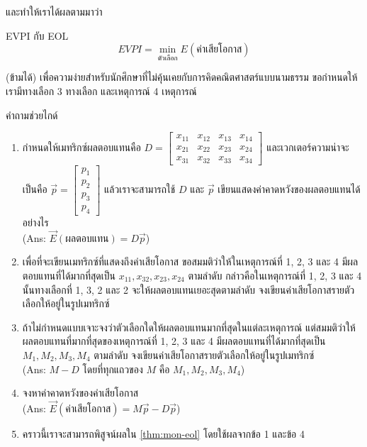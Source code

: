 และทำให้เราได้ผลตามมาว่า
\begin{corollary}
    {EVPI กับ EOL}{}
    $$
    EVPI = \min_{\text{ตัวเลือก}} E(\text{ค่าเสียโอกาส})
    $$
\end{corollary}
(ข้ามได้) เพื่อความง่ายสำหรับนักศึกษาที่ไม่คุ้นเคยกับการคิดคณิตศาสตร์แบบนามธรรม ขอกำหนดให้เรามีทางเลือก 3 ทางเลือก และเหตุการณ์ 4 เหตุการณ์ 
    \begin{exercise}
        {คำถามช่วยไกด์}{}
        \begin{enumerate}
            \item กำหนดให้เมทริกซ์ผลตอบแทนคือ $D=\begin{bmatrix}
                                                x_{11} & x_{12} & x_{13} & x_{14} \\
                                                x_{21} & x_{22} & x_{23} & x_{24} \\
                                                x_{31} & x_{32} & x_{33} & x_{34}
                                                \end{bmatrix}$ และเวกเตอร์ความน่าจะเป็นคือ $\vec{p} = \begin{bmatrix}
                                                p_{1}\\
                                                p_{2}\\
                                                p_{3}\\
                                                p_{4}
                                                \end{bmatrix}$ แล้วเราจะสามารถใช้ $D$ และ $\vec{p}$ เขียนแสดงค่าคาดหวังของผลตอบแทนได้อย่างไร\\(Ans: $\vec{E}(\text{ผลตอบแทน}) = D\vec{p}$)
            \item เพื่อที่จะเขียนเมทริกซ์ที่แสดงถึงค่าเสียโอกาส ขอสมมติว่าให้ในเหตุการณ์ที่ 1, 2, 3 และ 4 มีผลตอบแทนที่ได้มากที่สุดเป็น $x_{11}, x_{32}, x_{23}, x_{24}$ ตามลำดับ กล่าวคือในเหตุการณ์ที่ 1, 2, 3 และ 4 นั้นทางเลือกที่ 1, 3, 2 และ 2 จะให้ผลตอบแทนเยอะสุดตามลำดับ จงเขียนค่าเสียโอกาสรายตัวเลือกให้อยู่ในรูปเมทริกซ์
            \item ถ้าไม่กำหนดแบบเจาะจงว่าตัวเลือกใดให้ผลตอบแทนมากที่สุดในแต่ละเหตุการณ์ แต่สมมติว่าให้ผลตอบแทนที่มากที่สุดของเหตุการณ์ที่ 1, 2, 3 และ 4 มีผลตอบแทนที่ได้มากที่สุดเป็น $M_1, M_2, M_3, M_4$ ตามลำดับ จงเขียนค่าเสียโอกาสรายตัวเลือกให้อยู่ในรูปเมทริกซ์\\(Ans: $M - D$ โดยที่ทุกแถวของ $M$ คือ $M_1, M_2, M_3, M_4$)
            \item จงหาค่าคาดหวังของค่าเสียโอกาส\\(Ans: $\vec{E}(\text{ค่าเสียโอกาส}) = M\vec{p} - D\vec{p}$)
            \item คราวนี้เราจะสามารถพิสูจน์ผลใน \ref{thm:mon-eol} โดยใช้ผลจากข้อ 1 และข้อ 4
        \end{enumerate}
    \end{exercise}
    
